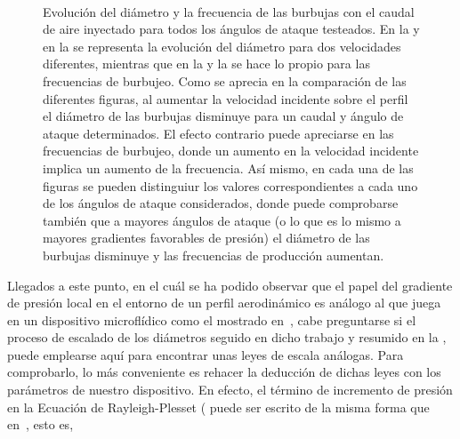 \begin{figure}
\centering
{}
\hspace{1mm} \\
\hspace{1mm}  
\caption{Evolución del diámetro y la frecuencia de las burbujas con el caudal de aire inyectado para todos los ángulos de ataque testeados. En la  y en la  se representa la evolución del diámetro para dos velocidades diferentes, mientras que en la  y la  se hace lo propio para las frecuencias de burbujeo. Como se aprecia en la comparación de las diferentes figuras, al aumentar la velocidad incidente sobre el perfil el diámetro de las burbujas disminuye para un caudal y ángulo de ataque determinados. El efecto contrario puede apreciarse en las frecuencias de burbujeo, donde un aumento en la velocidad incidente implica un aumento de la frecuencia. Así mismo, en cada una de las figuras se pueden distinguiur los valores correspondientes a cada uno de los ángulos de ataque considerados, donde puede comprobarse también que a mayores ángulos de ataque (o lo que es lo mismo a mayores gradientes favorables de presión) el diámetro de las burbujas disminuye y las frecuencias de producción aumentan. }
\end{figure}


Llegados a este punto, en el cuál se ha podido observar que el papel del gradiente de presión local en el entorno de un perfil aerodinámico es análogo al que juega en un dispositivo microflídico como el mostrado en~\cite{Evangelio2015}, cabe preguntarse si el proceso de escalado de los diámetros seguido en dicho trabajo y resumido en la , puede emplearse aquí para encontrar unas leyes de escala análogas. Para comprobarlo, lo más conveniente es rehacer la deducción de dichas leyes con los parámetros de nuestro dispositivo. En efecto, el término de incremento de presión en la Ecuación de Rayleigh-Plesset ( puede ser escrito de la misma forma que en~\cite{Evangelio2015}, esto es,

